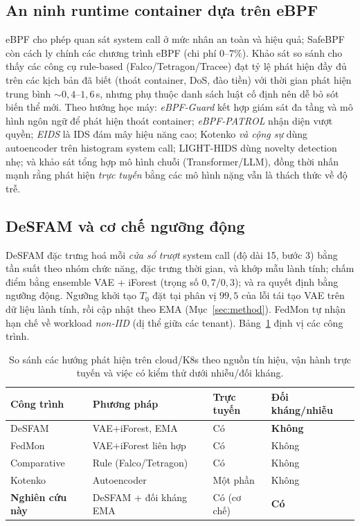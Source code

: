 \documentclass[conference,10pt]{IEEEtran}
\begin{document}
\subsection{An ninh runtime container dựa trên eBPF}
eBPF cho phép quan sát system call ở mức nhân an toàn và hiệu quả; SafeBPF \cite{safebpf2024} còn cách ly chính các chương trình eBPF (chi phí $0$--$7\%$). Khảo sát so sánh \cite{syairozi2025ebpfcompare} cho thấy các công cụ rule-based (Falco/Tetragon/Tracee) đạt tỷ lệ phát hiện đầy đủ trên các kịch bản đã biết (thoát container, DoS, đào tiền) với thời gian phát hiện trung bình $\sim 0{,}4$--$1{,}6$\,s, nhưng phụ thuộc danh sách luật cố định nên dễ bỏ sót biến thể mới. Theo hướng học máy: \textit{eBPF-Guard} \cite{ebpfguard2026} kết hợp giám sát đa tầng và mô hình ngôn ngữ để phát hiện thoát container; \textit{eBPF-PATROL} \cite{ebpfpatrol2025} nhận diện vượt quyền; \textit{EIDS} \cite{hu2026eids} là IDS đám mây hiệu năng cao; Kotenko \textit{và cộng sự} \cite{kotenko2025containerae} dùng autoencoder trên histogram system call; LIGHT-HIDS \cite{lighthids2025} dùng novelty detection nhẹ; và khảo sát \cite{translmidssurvey} tổng hợp mô hình chuỗi (Transformer/LLM), đồng thời nhấn mạnh rằng phát hiện \textit{trực tuyến} bằng các mô hình nặng vẫn là thách thức về độ trễ.

\subsection{DeSFAM và cơ chế ngưỡng động}
DeSFAM \cite{desfam_original} đặc trưng hoá mỗi \textit{cửa sổ trượt} system call (độ dài 15, bước 3) bằng tần suất theo nhóm chức năng, đặc trưng thời gian, và khớp mẫu lành tính; chấm điểm bằng ensemble VAE + iForest (trọng số $0{,}7/0{,}3$); và ra quyết định bằng ngưỡng động. Ngưỡng khởi tạo $T_0$ đặt tại phân vị $99{,}5$ của lỗi tái tạo VAE trên dữ liệu lành tính, rồi cập nhật theo EMA (Mục~\ref{sec:method}). FedMon \cite{fedmon2025} tự nhận hạn chế về workload \textit{non-IID} (dị thể giữa các tenant). Bảng~\ref{tab:related} định vị các công trình.

\begin{table}[t]
\caption{So sánh các hướng phát hiện trên cloud/K8s theo nguồn tín hiệu, vận hành trực tuyến và việc có kiểm thử dưới nhiễu/đối kháng.}
\label{tab:related}
\centering
\renewcommand{\arraystretch}{1.15}
\begin{tabular}{@{}p{1.8cm}p{1.7cm}p{1.3cm}p{1.3cm}@{}}
\toprule
\textbf{Công trình} & \textbf{Phương pháp} & \textbf{Trực tuyến} & \textbf{Đối kháng/nhiễu} \\
\midrule
DeSFAM \cite{desfam_original} & VAE+iForest, EMA & Có & \textbf{Không} \\
FedMon \cite{fedmon2025} & VAE+iForest liên hợp & Có & Không \\
Comparative \cite{syairozi2025ebpfcompare} & Rule (Falco/Tetragon) & Có & Không \\
Kotenko \cite{kotenko2025containerae} & Autoencoder & Một phần & Không \\
\textbf{Nghiên cứu này} & DeSFAM + đối kháng EMA & Có (cơ chế) & \textbf{Có} \\
\bottomrule
\end{tabular}
\end{table}
\end{document}
